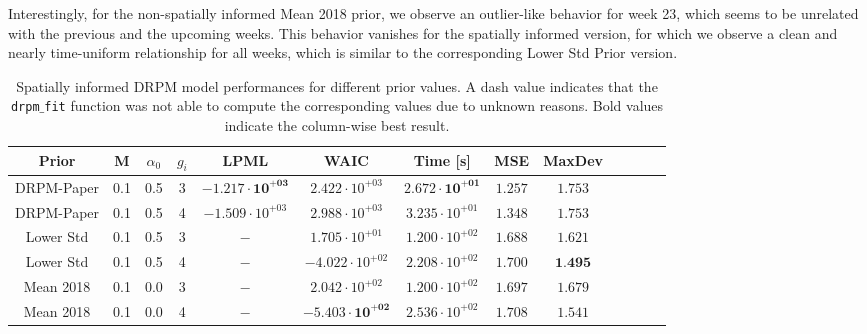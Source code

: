\documentclass[12pt,a4paper]{article}
\begin{document}
Interestingly, for the non-spatially informed Mean 2018 prior, we
observe an outlier-like behavior for week 23, which seems to be
unrelated with the previous and the upcoming weeks. This behavior
vanishes for the spatially informed version, for which
we observe
a clean and nearly time-uniform relationship for all weeks, which is
similar to the corresponding Lower Std Prior version.


\begin{table}
    \centering
    \begin{tabular}{ccccccccccccc}
    \toprule
    Prior & M & $\alpha_0$ & $g_i$ & LPML & WAIC & Time [s] & MSE & MaxDev \\
    \midrule
    DRPM-Paper & 0.1 & 0.5 & 3 & $\mathbf{-1.217 \cdot 10^{+03}}$ & $2.422 \cdot 10^{+03}$ & $\mathbf{2.672 \cdot 10^{+01}}$ & $\mathbf{1.257} $ & $1.753$ \\
    DRPM-Paper & 0.1 & 0.5 & 4 & $-1.509 \cdot 10^{+03}$ & $2.988 \cdot 10^{+03}$ & $3.235 \cdot 10^{+01}$ & $1.348 $ & $1.753$ \\
    Lower Std &  0.1 & 0.5 & 3 & $-$ & $1.705 \cdot 10^{+01}$ & $1.200 \cdot 10^{+02}$ & $1.688 $ & $1.621 $ \\
    Lower Std &  0.1 & 0.5 & 4 & $-$ & $-4.022 \cdot 10^{+02}$ & $2.208 \cdot 10^{+02}$ & $1.700 $ & $\textbf{1.495} $ \\
    Mean 2018 &  0.1 & 0.0 & 3 & $-$ & $2.042 \cdot 10^{+02}$ & $1.200 \cdot 10^{+02}$ & $1.697 $ & $1.679 $ \\
    Mean 2018 &  0.1 & 0.0 & 4 & $-$ & $\mathbf{-5.403 \cdot 10^{+02}}$ & $2.536 \cdot 10^{+02}$ & $1.708 $ & $1.541 $ \\
    \bottomrule
    \end{tabular}
\caption{Spatially informed DRPM model performances for different prior values. A dash value indicates that the \texttt{drpm$\_$fit} function
was not able to compute the corresponding values due to unknown reasons. Bold values indicate the column-wise best result.}
\label{tab:DRPMSpatialBaselineSummary}
\end{table}
\end{document}
